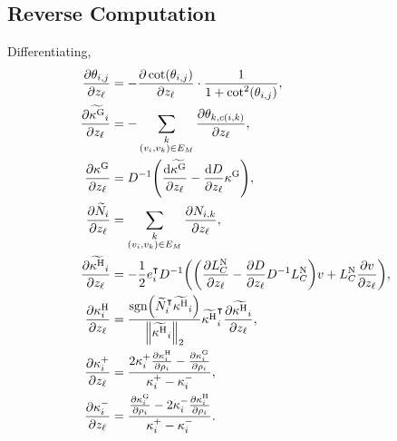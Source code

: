 \subsection{Reverse Computation}
Differentiating, \begin{align*}
	\frac{\partial\theta_{i, j}}{\partial z_\ell} &= -\frac{\partial\cot\pof{\theta_{i, j}}}{\partial z_\ell} \cdot \frac{1}{1 + \cot^2\pof{\theta_{i, j}}}, \\
	\frac{\partial\widetilde{\kappa^\text{G}}_i}{\partial z_\ell} &= -\sum_{\substack{k \\ \pof{v_i, v_k} \in E_M}} \frac{\partial\theta_{k, c\pof{i, k}}}{\partial z_\ell}, \\
	\frac{\partial\kappa^\text{G}}{\partial z_\ell} &= D^{-1}\pof{\frac{\dif\widetilde{\kappa^\text{G}}}{\partial z_\ell} - \frac{\dif D}{\partial z_\ell}\kappa^\text{G}}, \\
	\frac{\partial\widetilde{N}_i}{\partial z_\ell} &= \sum_{\substack{k \\ \pof{v_i, v_k} \in E_M}} \frac{\partial N_{i, k}}{\partial z_\ell}, \\
	\frac{\partial\widetilde{\kappa^\text{H}}_i}{\partial z_\ell} &= -\frac{1}{2}e_i^\intercal D^{-1}\pof{\pof{\frac{\partial L_C^{\text{N}}}{\partial z_\ell} - \frac{\partial D}{\partial z_\ell}D^{-1}L_C^{\text{N}}}v + L_C^{\text{N}}\frac{\partial v}{\partial z_\ell}}, \\
	\frac{\partial\kappa_i^\text{H}}{\partial z_\ell} &= \frac{\sgn\pof{\widetilde{N}_i^\intercal\widetilde{\kappa^\text{H}}_i}}{\norm{\widetilde{\kappa^\text{H}}_i}_2}\widetilde{\kappa^\text{H}}_i^\intercal\frac{\partial\widetilde{\kappa^\text{H}}_i}{\partial z_\ell}, \\
	\frac{\partial\kappa^+_i}{\partial z_\ell} &= \frac{2\kappa^+_i\frac{\partial\kappa^{\text{H}}_i}{\partial\rho_i} - \frac{\partial\kappa^{\text{G}}_i}{\partial\rho_i}}{\kappa^+_i - \kappa^-_i}, \\
	\frac{\partial\kappa^-_i}{\partial z_\ell} &= \frac{\frac{\partial\kappa^{\text{G}}_i}{\partial\rho_i} - 2\kappa^-_i\frac{\partial\kappa^{\text{H}}_i}{\partial\rho_i}}{\kappa^+_i - \kappa^-_i}.
\end{align*}
